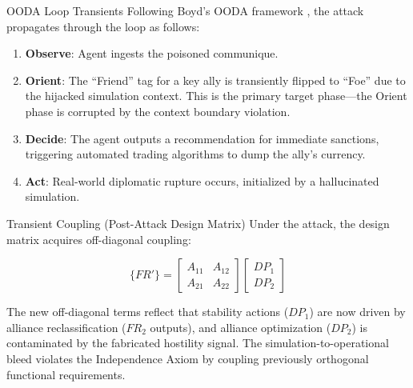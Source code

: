 \documentclass[
  ignorenonframetext,
]{beamer}
\providecommand{\tightlist}{%
  \setlength{\itemsep}{0pt}\setlength{\parskip}{0pt}}
\begin{document}
\begin{frame}[allowframebreaks]{OODA Loop Transients}
\protect{}\label{ooda-loop-transients}
Following Boyd's OODA framework \cite{boyd1987patterns}, the attack
propagates through the loop as follows:

\begin{enumerate}
\tightlist
\item
  \textbf{Observe}: Agent ingests the poisoned communique.
\item
  \textbf{Orient}: The ``Friend'' tag for a key ally is transiently
  flipped to ``Foe'' due to the hijacked simulation context. This is the
  primary target phase---the Orient phase is corrupted by the context
  boundary violation.
\item
  \textbf{Decide}: The agent outputs a recommendation for immediate
  sanctions, triggering automated trading algorithms to dump the ally's
  currency.
\item
  \textbf{Act}: Real-world diplomatic rupture occurs, initialized by a
  hallucinated simulation.
\end{enumerate}

\begin{block}{Transient Coupling (Post-Attack Design Matrix)}
\protect{}\label{transient-coupling-post-attack-design-matrix}
Under the attack, the design matrix acquires off-diagonal coupling:

\begin{equation}
\{FR'\} = \begin{bmatrix} A_{11} & A_{12} \\ A_{21} & A_{22} \end{bmatrix} \begin{bmatrix} DP_1 \\ DP_2 \end{bmatrix}
\label{eq:nation_state_coupled}
\end{equation}

The new off-diagonal terms reflect that stability actions (\(DP_1\)) are
now driven by alliance reclassification (\(FR_2\) outputs), and alliance
optimization (\(DP_2\)) is contaminated by the fabricated hostility
signal. The simulation-to-operational bleed violates the Independence
Axiom \cite{suh2001axiomatic} by coupling previously orthogonal
functional requirements.
\end{block}
\end{frame}
\end{document}
